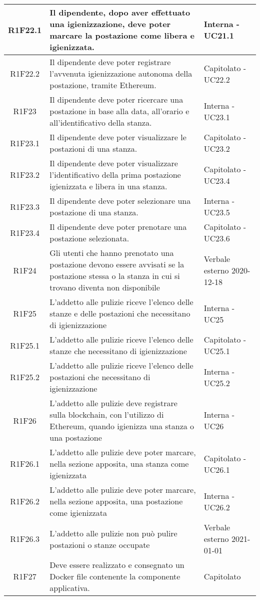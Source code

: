 \begin{center}
\begin{longtable}{|c|p{10cm}|p{4cm}|}
		\hline		
		R1F22.1&Il dipendente, dopo aver effettuato una igienizzazione, deve poter marcare la postazione come libera e igienizzata.	&Interna - UC21.1	\\
		\hline	
		R1F22.2&Il dipendente deve poter registrare l'avvenuta igienizzazione autonoma della postazione, tramite Ethereum.	&Capitolato - UC22.2	\\
		\hline	
		R1F23&Il dipendente deve poter ricercare una postazione in base alla data, all'orario e all'identificativo della stanza.	&Interna - UC23.1	\\
		\hline
		R1F23.1&Il dipendente deve poter visualizzare le postazioni di una stanza.	&Capitolato - UC23.2	\\
		\hline
		R1F23.2&Il dipendente deve poter visualizzare l'identificativo della prima postazione igienizzata e libera in una stanza.	&Capitolato - UC23.4	\\
		\hline
		R1F23.3&Il dipendente deve poter selezionare una postazione di una stanza.	&Interna - UC23.5	\\
		\hline
		R1F23.4&Il dipendente deve poter prenotare una postazione selezionata.	&Capitolato - UC23.6	\\
		\hline
		R1F24&Gli utenti che hanno prenotato una postazione devono essere avvisati se la postazione stessa o la stanza in cui si trovano diventa non disponibile	& Verbale esterno 2020-12-18	\\
		\hline
		
		R1F25&L'addetto alle pulizie riceve l'elenco delle stanze e delle postazioni che necessitano di igienizzazione	& Interna - UC25	\\
		\hline
		R1F25.1&	L'addetto alle pulizie riceve l'elenco delle stanze che necessitano di igienizzazione& 	Capitolato - UC25.1\\
		\hline
		R1F25.2&L'addetto alle pulizie riceve l'elenco delle postazioni che necessitano di igienizzazione	& Interna - UC25.2	\\
		\hline
		R1F26&L'addetto alle pulizie deve registrare sulla blockchain, con l'utilizzo di Ethereum, quando igienizza una stanza o una postazione	& Interna - UC26	\\
		\hline
		R1F26.1&L'addetto alle pulizie deve poter marcare, nella sezione apposita, una stanza come igienizzata	& Capitolato - UC26.1	\\
		\hline
		R1F26.2&L'addetto alle pulizie deve poter marcare, nella sezione apposita, una postazione come igienizzata	&Interna - UC26.2 	\\
		\hline
		R1F26.3&L'addetto alle pulizie non può pulire postazioni o stanze occupate	& Verbale esterno 2021-01-01	\\
		\hline
		R1F27 &Deve essere realizzato e consegnato un Docker file contenente la componente applicativa. & Capitolato\\
		\hline
						
	\end{longtable}
\end{center}


